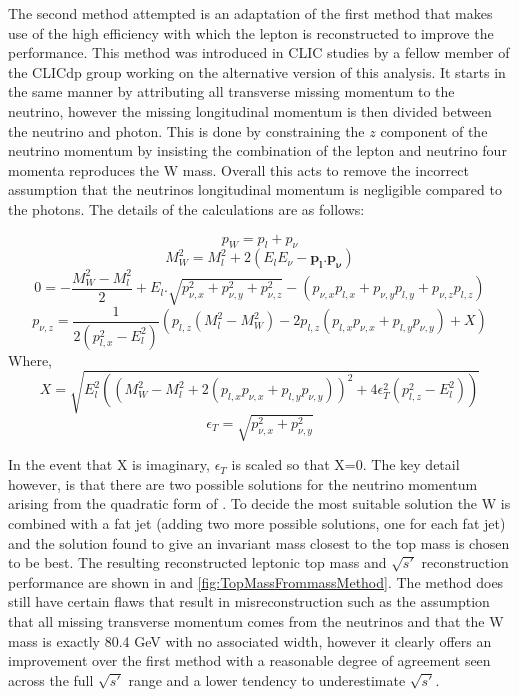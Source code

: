 The second method attempted is an adaptation of the first method that makes use of the high efficiency with which the lepton is reconstructed to improve the performance. This method was introduced in \ac{CLIC} studies by a fellow member of the CLICdp group working on the alternative version of this analysis\cite{TopPaperDraft}. It starts in the same manner by attributing all transverse missing momentum to the neutrino, however the missing longitudinal momentum is then divided between the neutrino and photon. This is done by constraining the $z$ component of the neutrino momentum by insisting the combination of the lepton and neutrino four momenta reproduces the W mass. Overall this acts to remove the incorrect assumption that the neutrinos longitudinal momentum is negligible compared to the photons. The details of the calculations are as follows:

\begin{equation}
  p_W=p_l+p_\nu
\end{equation}
\begin{equation}
M_W^2=M_l^2 + 2(E_lE_\nu - \mathbf{p_l.p_\nu})
\end{equation}
\begin{equation}
0=-\frac{M_W^2-M_l^2}{2} + E_l.\sqrt{p^2_{\nu , x}+p^2_{\nu , y}+p^2_{\nu , z}} - (p_{\nu , x}p_{l , x}+p_{\nu , y}p_{l , y}+p_{\nu , z}p_{l , z})
\end{equation}
\begin{equation}
p_{\nu , z}=\frac{1}{2(p^2_{l , x}-E^2_{l})} (p_{l , z}(M_l^2-M_W^2)-2p_{l , z}(p_{l , x}p_{\nu , x}+p_{l , y}p_{\nu , y}) + X)
\end{equation}
Where,
\begin{equation}
  \label{eq:X}
  X=\sqrt{E_l^2((M_W^2-M_l^2 +2(p_{l , x}p_{\nu , x}+p_{l , y}p_{\nu , y}))^2 +4\epsilon_T^2(p^2_{l , z}-E_l^2) )}
\end{equation}
\begin{equation}
  \epsilon_T=\sqrt{p^2_{\nu , x}+p^2_{\nu , y}}
\end{equation}

In the event that X is imaginary, $\epsilon_T$ is scaled so that X=0. The key detail however, is that there are two possible solutions for the neutrino momentum arising from the quadratic form of . To decide the most suitable solution the W is combined with a fat jet (adding two more possible solutions, one for each fat jet) and the solution found to give an invariant mass closest to the top mass is chosen to be best. The resulting reconstructed leptonic top mass and $\sqrt{s'}$ reconstruction performance are shown in  and \ref{fig:TopMassFrommassMethod}. The method does still have certain flaws that result in misreconstruction such as the assumption that all missing transverse momentum comes from the neutrinos and that the W mass is exactly 80.4 GeV with no associated width, however it clearly offers an improvement over the first method with a reasonable degree of agreement seen across the full $\sqrt{s'}$ range and a lower tendency to underestimate $\sqrt{s'}$.

